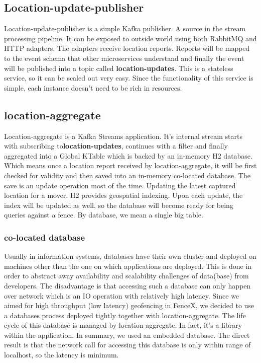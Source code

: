 \documentclass[a4]{report}
\begin{document}
    \subsection{Location-update-publisher}
    Location-update-publisher is a simple Kafka publisher.
    A source in the stream processing pipeline.
    It can be exposed to outside world using both RabbitMQ and HTTP adapters.
    The adapters receive location reports.
    Reports will be mapped to the event schema that other microservices
    understand and finally the event will be published into a topic called \textbf{location-updates}.
    This is a stateless service, so it can be scaled out very easy.
    Since the functionality of this service is simple, each instance doesn't need to be rich in resources.

    \subsection{location-aggregate}
    Location-aggregate is a Kafka Streams application.
    It's internal stream starts with subscribing to\textbf{location-updates}, continues with a filter and finally
    aggregated into a Global KTable which is backed by an in-memory H2 database.
    Which means once a location report received by location-aggregate, it will be first checked for validity and then
    saved into an in-memory co-located database.
    The save is an update operation most of the time.
    Updating the latest captured location for a mover.
    H2 provides geospatial indexing.
    Upon each update, the index will be updated as well, so the database will become ready for being queries against a
    fence.
    By database, we mean a single big table.
    \subsubsection{co-located database}
    Usually in information systems, databases have their own cluster and deployed on machines other than the one on
    which applications are deployed.
    This is done in order to abstract away availability and scalability challenges of data(base) from developers.
    The disadvantage is that accessing such a database can only happen over network which is an IO operation with
    relatively high latency.
    Since we aimed for high throughput (low latency) geofencing in FenceX, we decided to use a databases process
    deployed tightly together with location-aggregate.
    The life cycle of this database is managed by location-aggregate.
    In fact, it's a library within the application.
    In summary, we used an embedded database.
    The direct result is that the network call for accessing this database is only within range of localhost, so the
    latency is minimum.
\end{document}
